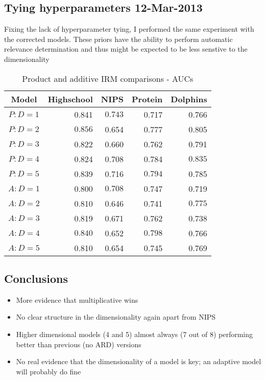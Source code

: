 \documentclass[twoside,11pt]{article}
\begin{document}
\subsection{Tying hyperparameters 12-Mar-2013}

Fixing the lack of hyperparameter tying, I performed the same experiment with the corrected models.
These priors have the ability to perform automatic relevance determination and thus might be expected to be less senstive to the dimensionality

\begin{table*}[ht!]
\caption{{\small
Product and additive IRM comparisons - AUCs
}}
\label{tbl:Prod Add IRM 11-Mar-2013}
\begin{center}
\begin{tabular}{c | r r r r}
Model & Highschool & NIPS & Protein & Dolphins \\
\hline
$P : D=1$ & 0.841 & $\mathbf{0.743}$ & 0.717 & 0.766 \\
$P : D=2$ & $\mathbf{0.856}$ & 0.654 & 0.777 & 0.805 \\
$P : D=3$ & 0.822 & 0.660 & 0.762 & 0.791 \\
$P : D=4$ & 0.824 & 0.708 & 0.784 & $\mathbf{0.835}$ \\
$P : D=5$ & 0.839 & 0.716 & $\mathbf{0.794}$ & 0.785 \\
\hline
$A : D=1$ & 0.800 & $\mathbf{0.708}$ & 0.747 & 0.719 \\
$A : D=2$ & 0.810 & 0.646 & 0.741 & $\mathbf{0.775}$ \\
$A : D=3$ & 0.819 & 0.671 & 0.762 & 0.738 \\
$A : D=4$ & $\mathbf{0.840}$ & 0.652 & $\mathbf{0.798}$ & 0.766 \\
$A : D=5$ & 0.810 & 0.654 & 0.745 & 0.769 \\
\end{tabular}
\end{center}
\end{table*}

\subsection{Conclusions}

\begin{itemize}
\item More evidence that multiplicative wins
\item No clear structure in the dimensionality again apart from NIPS
\item Higher dimensional models (4 and 5) almost always (7 out of 8) performing better than previous (no ARD) versions
\item No real evidence that the dimensionality of a model is key; an adaptive model will probably do fine
\end{itemize}
\end{document}
